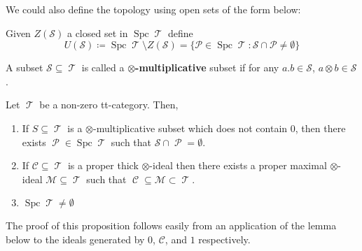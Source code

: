 \documentclass[11pt]{article}
\DeclareMathOperator{\CC}{\mathcal{C}}
\DeclareMathOperator{\TT}{\mathcal{T}}
\DeclareMathOperator{\cP}{\mathcal{P}}
\DeclareMathOperator{\spc}{Spc}
\begin{document}
We could also define the topology using open sets of the form below:

\begin{defn}
Given $Z(\mathcal{S})$ a closed set in $\spc \TT$ define 
\[
	U(\mathcal{S})\coloneqq \spc \TT \setminus Z(\mathcal{S}) = \{\mathcal{P} \in \spc \TT: \mathcal{S} \cap \mathcal{P} \not = \emptyset\}
\] 
\end{defn}

\begin{defn}
A subset $\mathcal{S} \subseteq \TT$ is called a \textbf{$\otimes$-multiplicative} subset if for any $a.b \in \mathcal{S}$, $a \otimes b \in \mathcal{S}$.
\end{defn}


\begin{prop}\label{multsubprops}
Let $\TT$ be a non-zero tt-category. Then, 
\begin{enumerate}[1.]
\item If $S \subseteq \TT$ is a $\otimes$-multiplicative subset which does not contain $0$, then there exists $\cP \in \spc \TT$ such that $\mathcal{S} \cap \cP = \emptyset$.
\item If $\mathcal{C} \subseteq \TT$ is a proper thick $\otimes$-ideal then there exists a proper maximal $\otimes$-ideal $\mathcal{M} \subseteq \TT$ such that $\CC \subseteq \mathcal{M} \subset \TT$.
	\item $\spc \TT \not = \emptyset$
\end{enumerate}
\end{prop}

The proof of this proposition follows easily from an application of the lemma below to the ideals generated by $0$, $\mathcal{C}$, and $1$ respectively.
\end{document}

